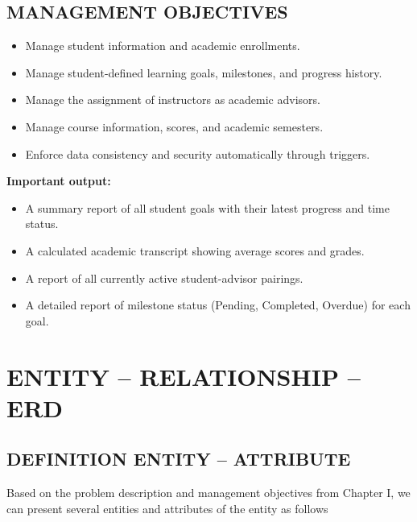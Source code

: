 \documentclass[12pt,a4paper]{report}
\begin{document}
\section{MANAGEMENT OBJECTIVES}

\begin{itemize}
    \item Manage student information and academic enrollments.
    \item Manage student-defined learning goals, milestones, and progress history.
    \item Manage the assignment of instructors as academic advisors.
    \item Manage course information, scores, and academic semesters.
    \item Enforce data consistency and security automatically through triggers.
\end{itemize}

\textbf{Important output:}
\begin{itemize}
    \item A summary report of all student goals with their latest progress and time status.
    \item A calculated academic transcript showing average scores and grades.
    \item A report of all currently active student-advisor pairings.
    \item A detailed report of milestone status (Pending, Completed, Overdue) for each goal.
\end{itemize}


\chapter{ENTITY -- RELATIONSHIP -- ERD}

\section{DEFINITION ENTITY -- ATTRIBUTE}

Based on the problem description and management objectives from Chapter I, we can present several entities and attributes of the entity as follows
\end{document}
